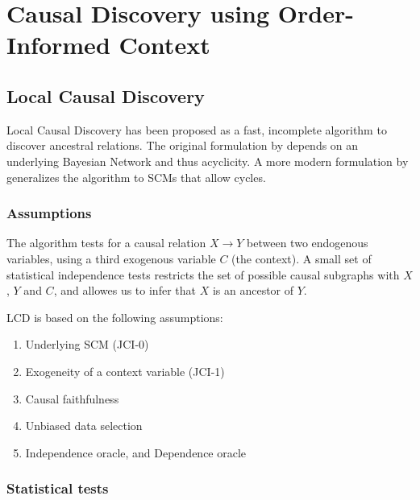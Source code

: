 \newpage
\section{Causal Discovery using Order-Informed Context}




\subsection{Local Causal Discovery}

Local Causal Discovery has been proposed as a fast, incomplete algorithm to discover ancestral relations. The original formulation by \citet{cooper1997simple} depends on an underlying Bayesian Network and thus acyclicity. A more modern formulation by \citet{mooij2016joint} generalizes the algorithm to SCMs that allow cycles. 



\subsubsection{Assumptions}

The algorithm tests for a causal relation $X\to Y$ between two endogenous variables, using a third exogenous variable $C$ (the context). A small set of statistical independence tests restricts the set of possible causal subgraphs with $X$, $Y$ and $C$, and allowes us to infer that $X$ is an ancestor of $Y$. 

LCD is based on the following assumptions:

\begin{enumerate}
    \item Underlying SCM (JCI-0)
    \item Exogeneity of a context variable (JCI-1)
    \item Causal faithfulness
    \item Unbiased data selection
    \item Independence oracle, and Dependence oracle
\end{enumerate}



\subsubsection{Statistical tests}

